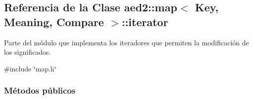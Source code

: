 \hypertarget{classaed2_1_1map_1_1iterator}{\subsection{\-Referencia de la \-Clase aed2\-:\-:map$<$ \-Key, \-Meaning, \-Compare $>$\-:\-:iterator}
\label{classaed2_1_1map_1_1iterator}
}


\-Parte del módulo que implementa los iteradores que permiten la modificación de los significados.  




{\ttfamily \#include \char`\"{}map.\-h\char`\"{}}

\subsubsection*{\-Métodos públicos}
